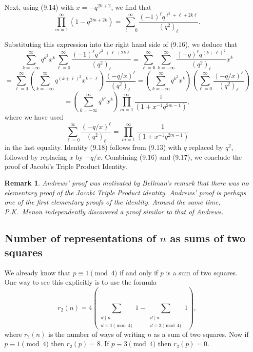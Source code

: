 \documentclass{article}
\newtheorem{remark}[theorem]{Remark}
\begin{document}
Next, using (9.14) with $x = -q^{2k+2}$, we find that
\[
\prod_{m=1}^{\infty} (1-q^{2m+2k}) = \sum_{\ell=0}^{\infty} \frac{(-1)^\ell q^{\ell^2+\ell+2k\ell}}{(q^2)_\ell}.
\]

Substituting this expression into the right hand side of (9.16), we deduce that
\[
\sum_{k=-\infty}^{\infty} q^{k^2} x^k \sum_{\ell=0}^{\infty} \frac{(-1)^\ell q^{\ell^2+\ell+2k\ell}}{(q^2)_\ell}
= \sum_{\ell=0}^{\infty} \sum_{k=-\infty}^{\infty} \frac{(-q)^\ell q^{(k+\ell)^2}}{(q^2)_\ell} x^k
\]
\[
= \sum_{\ell=0}^{\infty} \left(\sum_{k=-\infty}^{\infty} q^{(k+\ell)^2} x^{k+\ell}\right) \frac{(-q/x)^\ell}{(q^2)_\ell}
= \left(\sum_{k=-\infty}^{\infty} q^{k^2} x^k\right)\left(\sum_{\ell=0}^{\infty} \frac{(-q/x)^\ell}{(q^2)_\ell}\right)
\]
\begin{equation}
= \left(\sum_{k=-\infty}^{\infty} q^{k^2} x^k\right) \prod_{m=1}^{\infty} \frac{1}{(1+x^{-1}q^{2m-1})},
\tag{9.17}
\end{equation}
where we have used
\begin{equation}
\sum_{\ell=0}^{\infty} \frac{(-q/x)^\ell}{(q^2)_\ell} = \prod_{m=1}^{\infty} \frac{1}{(1+x^{-1}q^{2m-1})}
\tag{9.18}
\end{equation}
in the last equality. Identity (9.18) follows from (9.13) with $q$ replaced by $q^2$,
followed by replacing $x$ by $-q/x$. Combining (9.16) and (9.17), we conclude the
proof of Jacobi's Triple Product Identity.

\begin{remark}
Andrews' proof was motivated by Bellman's remark that there
was no elementary proof of the Jacobi Triple Product identity. Andrews' proof
is perhaps one of the first elementary proofs of the identity. Around the same
time, P.K.\ Menon independently discovered a proof similar to that of Andrews.
\end{remark}

\subsection{Number of representations of $n$ as sums of two squares}

We already know that $p \equiv 1 \pmod{4}$ if and only if $p$ is a sum of two squares.
One way to see this explicitly is to use the formula
\begin{equation}
r_2(n) = 4\left(\sum_{\substack{d \mid n \\ d \equiv 1 \pmod{4}}} 1 - \sum_{\substack{d \mid n \\ d \equiv 3 \pmod{4}}} 1\right),
\tag{9.19}
\end{equation}
where $r_2(n)$ is the number of ways of writing $n$ as a sum of two squares. Now if
$p \equiv 1 \pmod{4}$ then $r_2(p) = 8$. If $p \equiv 3 \pmod{4}$ then $r_2(p) = 0$.
\end{document}
